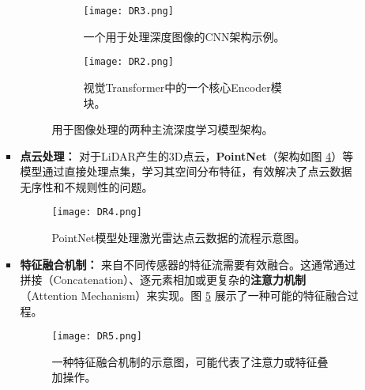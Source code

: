 \begin{itemize}
\begin{itemize}
\begin{itemize}
            \begin{figure}[htbp]
            \centering
            \begin{subfigure}[b]{0.48\textwidth}
                \centering
                \texttt{[image: DR3.png]}
                \caption{一个用于处理深度图像的CNN架构示例。}
                \label{fig:cnn_for_depth_image}
            \end{subfigure}
            \hfill
            \begin{subfigure}[b]{0.48\textwidth}
                \centering
                \texttt{[image: DR2.png]}
                \caption{视觉Transformer中的一个核心Encoder模块。}
                \label{fig:vision_transformer_architecture}
            \end{subfigure}
            \caption{用于图像处理的两种主流深度学习模型架构。}
            \label{fig:image_processing_architectures}
            \end{figure}

            \item \textbf{点云处理：} 对于LiDAR产生的3D点云，\textbf{PointNet}（架构如图 \ref{fig:pointnet_architecture}）等模型通过直接处理点集，学习其空间分布特征，有效解决了点云数据无序性和不规则性的问题。
            
            \begin{figure}[htbp]
                \centering
                \texttt{[image: DR4.png]}
                \caption{PointNet模型处理激光雷达点云数据的流程示意图。}
                \label{fig:pointnet_architecture}
            \end{figure}
            
            \item \textbf{特征融合机制：} 来自不同传感器的特征流需要有效融合。这通常通过拼接（Concatenation）、逐元素相加或更复杂的\textbf{注意力机制}（Attention Mechanism）来实现。图 \ref{fig:feature_fusion_mechanism} 展示了一种可能的特征融合过程。

             \begin{figure}[htbp]
                \centering
                \texttt{[image: DR5.png]}
                \caption{一种特征融合机制的示意图，可能代表了注意力或特征叠加操作。}
                \label{fig:feature_fusion_mechanism}
            \end{figure}
            
        \end{itemize}
    \end{itemize}


\end{itemize}
